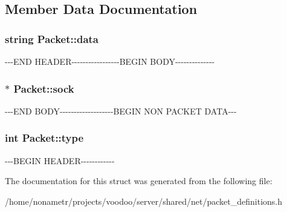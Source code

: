 \subsection{\-Member \-Data \-Documentation}
\hypertarget{structPacket_a98961f942ac0ff932175cd8558b93814}{
\subsubsection[{data}]{\setlength{\rightskip}{0pt plus 5cm}string {\bf \-Packet\-::data}}}\label{structPacket_a98961f942ac0ff932175cd8558b93814}
-\/-\/-\/\-E\-N\-D \-H\-E\-A\-D\-E\-R-\/-\/-\/-\/-\/-\/-\/-\/-\/-\/-\/-\/-\/-\/-\/-\/-\/\-B\-E\-G\-I\-N \-B\-O\-D\-Y-\/-\/-\/-\/-\/-\/-\/-\/-\/-\/-\/-\/-\/-\/ \hypertarget{structPacket_ac939137a80df54d936b34c1135237235}{
\subsubsection[{sock}]{$\ast$ {\bf \-Packet\-::sock}}}\label{structPacket_ac939137a80df54d936b34c1135237235}
-\/-\/-\/\-E\-N\-D \-B\-O\-D\-Y-\/-\/-\/-\/-\/-\/-\/-\/-\/-\/-\/-\/-\/-\/-\/-\/-\/-\/-\/\-B\-E\-G\-I\-N \-N\-O\-N \-P\-A\-C\-K\-E\-T \-D\-A\-T\-A-\/-\/-\/ \hypertarget{structPacket_a54aec3ba8853c913416e1fff792bfa84}{
\subsubsection[{type}]{\setlength{\rightskip}{0pt plus 5cm}int {\bf \-Packet\-::type}}}\label{structPacket_a54aec3ba8853c913416e1fff792bfa84}
-\/-\/-\/\-B\-E\-G\-I\-N \-H\-E\-A\-D\-E\-R-\/-\/-\/-\/-\/-\/-\/-\/-\/-\/-\/-\/ 

\-The documentation for this struct was generated from the following file\-:\begin{DoxyCompactItemize}
\item 
/home/nonametr/projects/voodoo/server/shared/net/packet\-\_\-definitions.\-h\end{DoxyCompactItemize}
